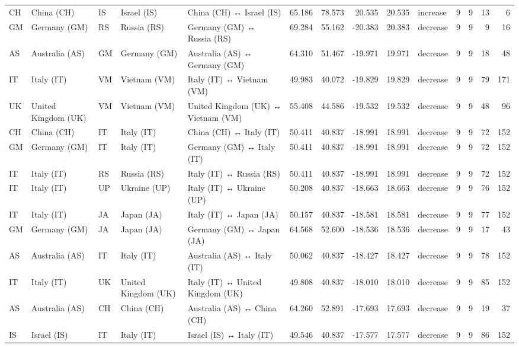 \begin{tabular}{lllllrrrrlrrrr}
CH & China (CH) & IS & Israel (IS) & China (CH) ↔ Israel (IS) & 65.186 & 78.573 & 20.535 & 20.535 & increase & 9 & 9 & 13 & 6 \\
GM & Germany (GM) & RS & Russia (RS) & Germany (GM) ↔ Russia (RS) & 69.284 & 55.162 & -20.383 & 20.383 & decrease & 9 & 9 & 9 & 16 \\
AS & Australia (AS) & GM & Germany (GM) & Australia (AS) ↔ Germany (GM) & 64.310 & 51.467 & -19.971 & 19.971 & decrease & 9 & 9 & 18 & 48 \\
IT & Italy (IT) & VM & Vietnam (VM) & Italy (IT) ↔ Vietnam (VM) & 49.983 & 40.072 & -19.829 & 19.829 & decrease & 9 & 9 & 79 & 171 \\
UK & United Kingdom (UK) & VM & Vietnam (VM) & United Kingdom (UK) ↔ Vietnam (VM) & 55.408 & 44.586 & -19.532 & 19.532 & decrease & 9 & 9 & 48 & 96 \\
CH & China (CH) & IT & Italy (IT) & China (CH) ↔ Italy (IT) & 50.411 & 40.837 & -18.991 & 18.991 & decrease & 9 & 9 & 72 & 152 \\
GM & Germany (GM) & IT & Italy (IT) & Germany (GM) ↔ Italy (IT) & 50.411 & 40.837 & -18.991 & 18.991 & decrease & 9 & 9 & 72 & 152 \\
IT & Italy (IT) & RS & Russia (RS) & Italy (IT) ↔ Russia (RS) & 50.411 & 40.837 & -18.991 & 18.991 & decrease & 9 & 9 & 72 & 152 \\
IT & Italy (IT) & UP & Ukraine (UP) & Italy (IT) ↔ Ukraine (UP) & 50.208 & 40.837 & -18.663 & 18.663 & decrease & 9 & 9 & 76 & 152 \\
IT & Italy (IT) & JA & Japan (JA) & Italy (IT) ↔ Japan (JA) & 50.157 & 40.837 & -18.581 & 18.581 & decrease & 9 & 9 & 77 & 152 \\
GM & Germany (GM) & JA & Japan (JA) & Germany (GM) ↔ Japan (JA) & 64.568 & 52.600 & -18.536 & 18.536 & decrease & 9 & 9 & 17 & 43 \\
AS & Australia (AS) & IT & Italy (IT) & Australia (AS) ↔ Italy (IT) & 50.062 & 40.837 & -18.427 & 18.427 & decrease & 9 & 9 & 78 & 152 \\
IT & Italy (IT) & UK & United Kingdom (UK) & Italy (IT) ↔ United Kingdom (UK) & 49.808 & 40.837 & -18.010 & 18.010 & decrease & 9 & 9 & 85 & 152 \\
AS & Australia (AS) & CH & China (CH) & Australia (AS) ↔ China (CH) & 64.260 & 52.891 & -17.693 & 17.693 & decrease & 9 & 9 & 19 & 37 \\
IS & Israel (IS) & IT & Italy (IT) & Israel (IS) ↔ Italy (IT) & 49.546 & 40.837 & -17.577 & 17.577 & decrease & 9 & 9 & 86 & 152 \\

\end{tabular}
